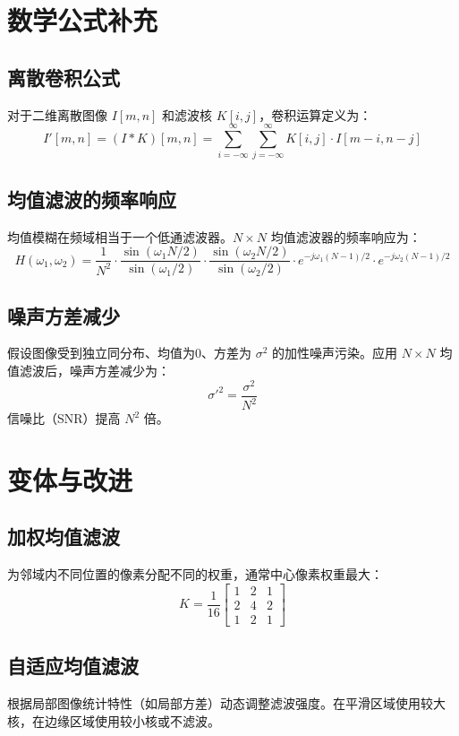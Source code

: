\documentclass{article}
\begin{document}
\section{数学公式补充}

\subsection{离散卷积公式}
对于二维离散图像 $I[m,n]$ 和滤波核 $K[i,j]$，卷积运算定义为：
\[
I'[m,n] = (I * K)[m,n] = \sum_{i=-\infty}^{\infty} \sum_{j=-\infty}^{\infty} K[i,j] \cdot I[m-i, n-j]
\]

\subsection{均值滤波的频率响应}
均值模糊在频域相当于一个低通滤波器。$N \times N$ 均值滤波器的频率响应为：
\[
H(\omega_1, \omega_2) = \frac{1}{N^2} \cdot \frac{\sin(\omega_1 N/2)}{\sin(\omega_1/2)} \cdot \frac{\sin(\omega_2 N/2)}{\sin(\omega_2/2)} \cdot e^{-j\omega_1(N-1)/2} \cdot e^{-j\omega_2(N-1)/2}
\]

\subsection{噪声方差减少}
假设图像受到独立同分布、均值为0、方差为 $\sigma^2$ 的加性噪声污染。应用 $N \times N$ 均值滤波后，噪声方差减少为：
\[
\sigma'^2 = \frac{\sigma^2}{N^2}
\]
信噪比（SNR）提高 $N^2$ 倍。

\section{变体与改进}

\subsection{加权均值滤波}
为邻域内不同位置的像素分配不同的权重，通常中心像素权重最大：
\[
K = \frac{1}{16} \begin{bmatrix}
1 & 2 & 1 \\
2 & 4 & 2 \\
1 & 2 & 1
\end{bmatrix}
\]

\subsection{自适应均值滤波}
根据局部图像统计特性（如局部方差）动态调整滤波强度。在平滑区域使用较大核，在边缘区域使用较小核或不滤波。
\end{document}
